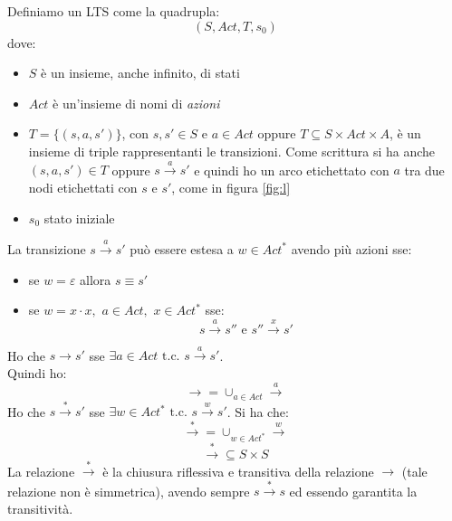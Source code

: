 \documentclass[a4paper,12pt, oneside]{book}
\begin{document}
\begin{definizione}
  Definiamo un LTS come la quadrupla:
  \[(S, Act, T, s_0)\]
  dove:
  \begin{itemize}
    \item $S$ è un insieme, anche infinito, di stati
    \item $Act$ è un'insieme di nomi di \textit{azioni}
    \item $T=\{(s,a,s')\}$, con $s,s'\in S$ e $a\in Act$ oppure $T\subseteq
    S\times Act\times A$, è un insieme di triple rappresentanti le
    transizioni. Come scrittura si ha anche $(s,a,s')\in T$ oppure
    $s\stackrel{a}{\rightarrow} s'$ e quindi ho un arco etichettato con $a$ tra
    due nodi etichettati con $s$ e $s'$, come in figura \ref{fig:l}
    \item $s_0$ stato iniziale
  \end{itemize}
  La transizione $s\stackrel{a}{\rightarrow} s'$ può essere estesa a $w\in
  Act^*$ avendo più azioni sse:
  \begin{itemize}
    \item se $w=\varepsilon$ allora $s\equiv s'$
    \item se $w=x\cdot x,\,\,a\in Act,\,\,x\in Act^*$ sse:
    \[s\stackrel{a}{\rightarrow} s'' \mbox{ e } s''\stackrel{x}{\rightarrow}
      s'\]
  \end{itemize}
  Ho che $s\rightarrow s'$ sse $\exists a \in Act \mbox{ t.c. }
  s\stackrel{a}{\rightarrow} s'$.\\
  Quindi ho:
  \[\rightarrow =\cup_{a\in Act}\stackrel{a}{\rightarrow}\]
  Ho che $s\stackrel{*}{\rightarrow} s'$ sse $\exists w\in Act^*\mbox{ t.c. }
  s\stackrel{w}{\rightarrow} s'$. Si ha che:
  \[\stackrel{*}{\rightarrow}=\cup_{w\in Act^*}\stackrel{w}{\rightarrow}\]
  \[\stackrel{*}{\rightarrow}\subseteq S\times S\]
  La relazione $\stackrel{*}{\rightarrow}$ è la chiusura riflessiva e transitiva
  della relazione $\rightarrow$ (tale relazione non è simmetrica), avendo sempre
  $s\stackrel{*}{\rightarrow}s$ ed essendo garantita la transitività.
\end{definizione}
\end{document}
